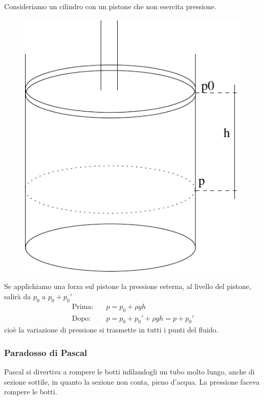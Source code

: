 Consideriamo un cilindro con un pistone che non esercita pressione.

\begin{figure}[htbp]
\centering
\includegraphics[scale=0.5]{immagini/fisica1/Pascal1}
\end{figure}

Se applichiamo una forza sul pistone la pressione esterna, al livello del pistone, salirà da $p_0$ a $p_0+p_0'$
\begin{align*}
\text{Prima:}&\quad p=p_0+\rho gh\\
\text{Dopo:}&\quad p=p_0+p_0'+\rho gh=p+p_0'
\end{align*}
cioè la variazione di pressione si trasmette in tutti i punti del fluido.
\subsubsection{Paradosso di Pascal}
Pascal si divertiva a rompere le botti infilandogli un tubo molto lungo, anche di sezione sottile, in quanto la sezione non conta, pieno d'acqua. La pressione faceva rompere le botti.

